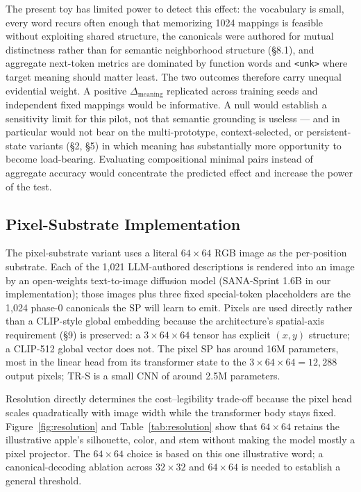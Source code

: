 \documentclass[11pt,a4paper]{article}
\begin{document}
The present toy has limited power to detect this effect: the vocabulary is small, every word recurs often enough that memorizing 1024 mappings is feasible without exploiting shared structure, the canonicals were authored for mutual distinctness rather than for semantic neighborhood structure (§8.1), and aggregate next-token metrics are dominated by function words and \texttt{<unk>} where target meaning should matter least. The two outcomes therefore carry unequal evidential weight. A positive $\Delta_{\mathrm{meaning}}$ replicated across training seeds and independent fixed mappings would be informative. A null would establish a sensitivity limit for this pilot, not that semantic grounding is useless --- and in particular would not bear on the multi-prototype, context-selected, or persistent-state variants (§2, §5) in which meaning has substantially more opportunity to become load-bearing. Evaluating compositional minimal pairs instead of aggregate accuracy would concentrate the predicted effect and increase the power of the test.

\subsection{Pixel-Substrate Implementation}

The pixel-substrate variant uses a literal $64{\times}64$ RGB image as the per-position substrate. Each of the 1,021 LLM-authored descriptions is rendered into an image by an open-weights text-to-image diffusion model (SANA-Sprint 1.6B \cite{sanasprint2025} in our implementation); those images plus three fixed special-token placeholders are the 1,024 phase-0 canonicals the SP will learn to emit. Pixels are used directly rather than a CLIP-style global embedding because the architecture's spatial-axis requirement (§9) is preserved: a $3{\times}64{\times}64$ tensor has explicit $(x, y)$ structure; a CLIP-512 global vector does not. The pixel SP has around 16M parameters, most in the linear head from its transformer state to the $3{\times}64{\times}64 = 12{,}288$ output pixels; TR-S is a small CNN of around 2.5M parameters.

Resolution directly determines the cost--legibility trade-off because the pixel head scales quadratically with image width while the transformer body stays fixed. Figure~\ref{fig:resolution} and Table~\ref{tab:resolution} show that $64 \times 64$ retains the illustrative apple's silhouette, color, and stem without making the model mostly a pixel projector. The $64 \times 64$ choice is based on this one illustrative word; a canonical-decoding ablation across $32 \times 32$ and $64 \times 64$ is needed to establish a general threshold.
\end{document}
